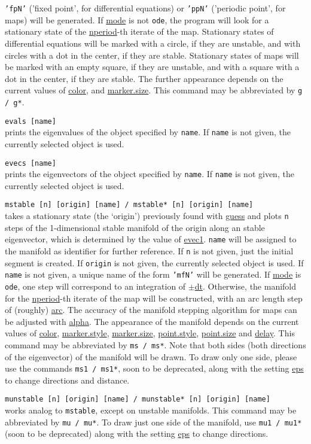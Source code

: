 \documentclass[10pt,a4paper,titlepage]{article}
\newcommand{\cmd}[2]{\item{\T{\hypertarget{#1}{#1}\index[index]{#1} #2}}}
\newcommand{\HL}[1]{\hyperlink{#1}{#1}}
\newcommand{\T}[1]{\texttt{#1}}
\begin{document}
\begin{description}
\T{'fpN'} ('fixed point', for differential equations) or \T{'ppN'} ('periodic point', for maps) will be generated. If \HL{mode} is not \T{ode}, the program will look for a stationary state of the \HL{nperiod}-th iterate of the map. Stationary states of differential equations will be marked with a circle, if they are unstable, and with circles with a dot in the center, if they are stable. Stationary states of maps will be marked with an empty square, if they are unstable, and with a square with a dot in the center, if they are stable. The further appearance depends on the current values of \HL{color}, and \HL{marker.size}. This command may be abbreviated by \T{g / g*}.
\cmd{evals}{[name]}\\
prints the eigenvalues of the object specified by \T{name}. If \T{name} is not given, the currently selected object is used.  
\cmd{evecs}{[name]}\\
prints the eigenvectors of the object specified by \T{name}. If \T{name} is not given, the currently selected object is used.  
\cmd{mstable}{[n] [origin] [name] / mstable* [n] [origin] [name]}\\takes a stationary state (the `origin') previously found with \HL{guess} and plots \T{n} steps of the 1-dimensional stable manifold of the origin along an stable eigenvector, which is determined by the value of \HL{evec1}.  \T{name} will be assigned to the manifold as identifier for further reference. If \T{n} is not given, just the initial segment is created. If \T{origin} is not given, the currently selected object is used. If \T{name} is not given, a unique name of the form \T{'mfN'} will be generated. If \HL{mode} is \T{ode}, one step will correspond to an integration of $\pm$\HL{dt}. Otherwise, the manifold for the \HL{nperiod}-th iterate of the map will be constructed, with an arc length step of (roughly) \HL{arc}. The accuracy of the manifold stepping algorithm for maps can be adjusted with \HL{alpha}. The appearance of the manifold depends on the current values of \HL{color}, \HL{marker.style}, \HL{marker.size}, \HL{point.style}, \HL{point.size} and \HL{delay}. This command may be abbreviated by \T{ms / ms*}. Note that both sides (both directions of the eigenvector) of the manifold will be drawn. To draw only one side, please use the commands \T{ms1 / ms1*}, soon to be deprecated, along with the setting \HL{eps} to change directions and distance.
\cmd{munstable}{[n] [origin] [name] / munstable* [n] [origin] [name]}\\
works analog to \T{mstable}, except on unstable manifolds. This command may be abbreviated by \T{mu / mu*}. To draw just one side of the manifold, use \T{mu1 / mu1*} (soon to be deprecated) along with the setting \HL{eps} to change directions.

\end{description}
\end{document}
